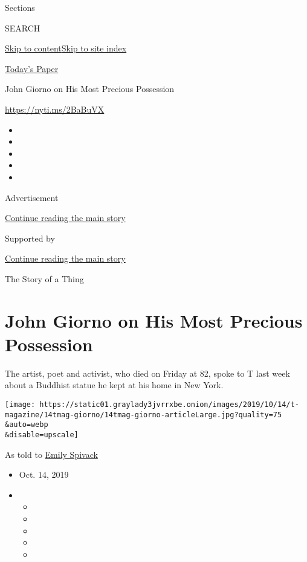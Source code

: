 Sections

SEARCH

\protect\hyperlink{site-content}{Skip to
content}\protect\hyperlink{site-index}{Skip to site index}

\href{https://myaccount.nytimes3xbfgragh.onion/auth/login?response_type=cookie\&client_id=vi}{}

\href{https://www.nytimes3xbfgragh.onion/section/todayspaper}{Today's
Paper}

John Giorno on His Most Precious Possession

\url{https://nyti.ms/2BaBuVX}

\begin{itemize}
\item
\item
\item
\item
\item
\end{itemize}

Advertisement

\protect\hyperlink{after-top}{Continue reading the main story}

Supported by

\protect\hyperlink{after-sponsor}{Continue reading the main story}

The Story of a Thing

\hypertarget{john-giorno-on-his-most-precious-possession}{%
\section{John Giorno on His Most Precious
Possession}\label{john-giorno-on-his-most-precious-possession}}

The artist, poet and activist, who died on Friday at 82, spoke to T last
week about a Buddhist statue he kept at his home in New York.

\texttt{[image: https://static01.graylady3jvrrxbe.onion/images/2019/10/14/t-magazine/14tmag-giorno/14tmag-giorno-articleLarge.jpg?quality=75\\\&auto=webp\\\&disable=upscale]}

As told to
\href{https://www.nytimes3xbfgragh.onion/by/emily-spivack}{Emily
Spivack}

\begin{itemize}
\item
  Oct. 14, 2019
\item
  \begin{itemize}
  \item
  \item
  \item
  \item
  \item
  \end{itemize}
\end{itemize}

